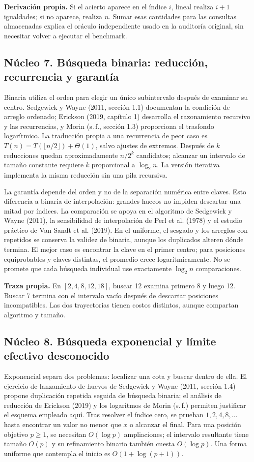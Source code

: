\textbf{Derivación propia.} Si el acierto aparece en el índice $i$, lineal realiza $i+1$ igualdades; si no aparece, realiza $n$. Sumar esas cantidades para las consultas almacenadas explica el oráculo independiente usado en la auditoría original, sin necesitar volver a ejecutar el benchmark.

\subsection{Núcleo 7. Búsqueda binaria: reducción, recurrencia y garantía}
Binaria utiliza el orden para elegir un único subintervalo después de examinar su centro. Sedgewick y Wayne (2011, sección 1.1) documentan la condición de arreglo ordenado; Erickson (2019, capítulo 1) desarrolla el razonamiento recursivo y las recurrencias, y Morin (s.\,f., sección 1.3) proporciona el trasfondo logarítmico. La traducción propia a una recurrencia de peor caso es $T(n)=T(\lfloor n/2\rfloor)+\Theta(1)$, salvo ajustes de extremos. Después de $k$ reducciones quedan aproximadamente $n/2^k$ candidatos; alcanzar un intervalo de tamaño constante requiere $k$ proporcional a $\log_2n$. La versión iterativa implementa la misma reducción sin una pila recursiva.

La garantía depende del orden y no de la separación numérica entre claves. Esto diferencia a binaria de interpolación: grandes huecos no impiden descartar una mitad por índices. La comparación se apoya en el algoritmo de Sedgewick y Wayne (2011), la sensibilidad de interpolación de Perl et al. (1978) y el estudio práctico de Van Sandt et al. (2019). En el uniforme, el sesgado y los arreglos con repetidos se conserva la validez de binaria, aunque los duplicados alteren dónde termina. El mejor caso es encontrar la clave en el primer centro; para posiciones equiprobables y claves distintas, el promedio crece logarítmicamente. No se promete que cada búsqueda individual use exactamente $\log_2n$ comparaciones.

\textbf{Traza propia.} En $[2,4,8,12,18]$, buscar 12 examina primero 8 y luego 12. Buscar 7 termina con el intervalo vacío después de descartar posiciones incompatibles. Las dos trayectorias tienen costos distintos, aunque compartan algoritmo y tamaño.

\subsection{Núcleo 8. Búsqueda exponencial y límite efectivo desconocido}
Exponencial separa dos problemas: localizar una cota y buscar dentro de ella. El ejercicio de lanzamiento de huevos de Sedgewick y Wayne (2011, sección 1.4) propone duplicación repetida seguida de búsqueda binaria; el análisis de reducción de Erickson (2019) y los logaritmos de Morin (s.\,f.) permiten justificar el esquema empleado aquí. Tras resolver el índice cero, se prueban $1,2,4,8,\ldots$ hasta encontrar un valor no menor que $x$ o alcanzar el final. Para una posición objetivo $p\geq1$, se necesitan $O(\log p)$ ampliaciones; el intervalo resultante tiene tamaño $O(p)$ y su refinamiento binario también cuesta $O(\log p)$. Una forma uniforme que contempla el inicio es $O(1+\log(p+1))$.

